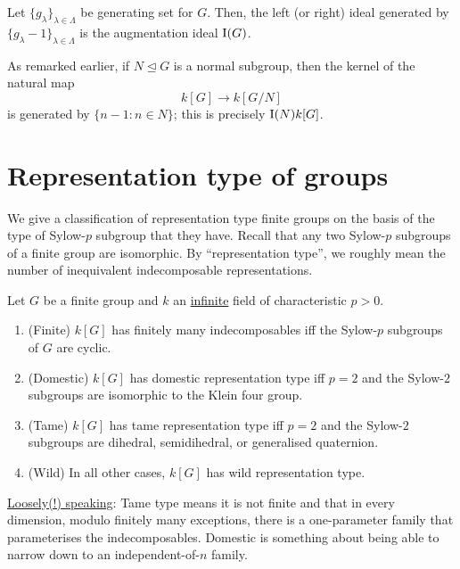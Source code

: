 \documentclass[12pt]{article}
\begin{document}
\begin{thm}
	Let $\{g_{\lambda}\}_{\lambda \in \Lambda}$ be generating set for $G$. 
	Then, the left (or right) ideal generated by $\{g_{\lambda} - 1\}_{\lambda \in \Lambda}$ is the augmentation ideal $\operatorname{I}(G)$.
\end{thm}

As remarked earlier, if $N \unlhd G$ is a normal subgroup, then the kernel of the natural map
\begin{equation*} 
	k[G] \to k[G/N]
\end{equation*}
is generated by $\{n - 1 : n \in N\}$; this is precisely $\operatorname{I}(N)k[G]$.

\section{Representation type of groups}

We give a classification of representation type finite groups on the basis
of the type of Sylow-$p$ subgroup that they have. 
Recall that any two Sylow-$p$ subgroups of a finite group are isomorphic.
By ``representation type'', we roughly mean the number of inequivalent indecomposable representations. 

\begin{thm}
	Let $G$ be a finite group and $k$ an \underline{infinite} field of characteristic $p > 0$.
	\begin{enumerate}[label=(\alph*)]
		\item (Finite) $k[G]$ has finitely many indecomposables iff the Sylow-$p$ subgroups of $G$ are cyclic.
		\item (Domestic) $k[G]$ has domestic representation type iff $p = 2$ and the Sylow-$2$ subgroups are isomorphic to the Klein four group.
		\item (Tame) $k[G]$ has tame representation type iff $p = 2$ and the Sylow-$2$ subgroups are dihedral, semidihedral, or generalised quaternion.
		\item (Wild) In all other cases, $k[G]$ has wild representation type.
	\end{enumerate}
\end{thm}
\underline{Loosely(!) speaking}: Tame type means it is not finite and 
that in every dimension,
modulo finitely many exceptions, there is a one-parameter family 
that parameterises the indecomposables. \newline
Domestic is something about being able to narrow down to an independent-of-$n$ family.
\end{document}
